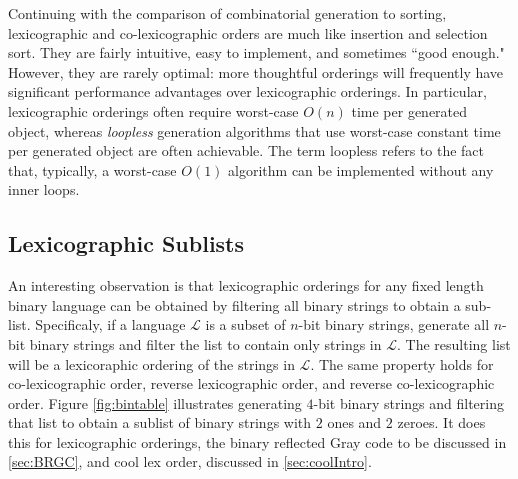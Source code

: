 Continuing with the comparison of combinatorial generation to sorting, lexicographic and co-lexicographic orders are much like insertion and selection sort.  They are fairly intuitive, easy to implement, and sometimes ``good enough."  However, they are rarely optimal: more thoughtful orderings will frequently have significant performance advantages over lexicographic orderings. In particular, lexicographic orderings often require worst-case $O(n)$ time per generated object, whereas \emph{loopless} generation algorithms that use worst-case constant time per generated object are often achievable. The term loopless refers to the fact that, typically, a worst-case $O(1)$ algorithm can be implemented without any inner loops.

 \subsection{Lexicographic Sublists}
 An interesting observation is that lexicographic orderings for any fixed length binary language can be obtained by filtering all binary strings to obtain a sub-list. Specificaly, if a language $\mathcal{L}$ is a subset of $n$-bit binary strings, generate all $n$-bit binary strings and filter the list to contain only strings in $\mathcal{L}$.  The resulting list will be a lexicoraphic ordering of the strings in $\mathcal{L}$.  The same property holds for co-lexicographic order, reverse lexicographic order, and reverse co-lexicographic order.  Figure \ref{fig:bintable} illustrates generating $4$-bit binary strings and filtering that list to obtain a sublist of binary strings with $2$ ones and $2$ zeroes.  It does this for lexicographic orderings, the binary reflected Gray code to be discussed in \ref{sec:BRGC}, and cool lex order, discussed in \ref{sec:coolIntro}.



